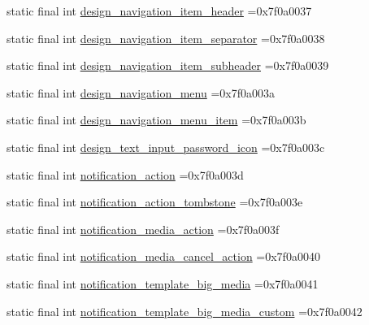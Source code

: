 \begin{DoxyCompactItemize}
\item 
static final int \mbox{\hyperlink{classbr_1_1unb_1_1cic_1_1mp_1_1marketmaster_1_1R_1_1layout_a9337038bad71dd40e637136ec0057a3c}{design\+\_\+navigation\+\_\+item\+\_\+header}} =0x7f0a0037
\item 
static final int \mbox{\hyperlink{classbr_1_1unb_1_1cic_1_1mp_1_1marketmaster_1_1R_1_1layout_a5ff2a171d26e739d5a6752ec79a5423c}{design\+\_\+navigation\+\_\+item\+\_\+separator}} =0x7f0a0038
\item 
static final int \mbox{\hyperlink{classbr_1_1unb_1_1cic_1_1mp_1_1marketmaster_1_1R_1_1layout_acec0765c8b8c0e75899d2e8a717c468a}{design\+\_\+navigation\+\_\+item\+\_\+subheader}} =0x7f0a0039
\item 
static final int \mbox{\hyperlink{classbr_1_1unb_1_1cic_1_1mp_1_1marketmaster_1_1R_1_1layout_a94fc03cfe04b2fdd609c22db4cee2d8a}{design\+\_\+navigation\+\_\+menu}} =0x7f0a003a
\item 
static final int \mbox{\hyperlink{classbr_1_1unb_1_1cic_1_1mp_1_1marketmaster_1_1R_1_1layout_a3412d12d7cde2d1b6358a148ec426e03}{design\+\_\+navigation\+\_\+menu\+\_\+item}} =0x7f0a003b
\item 
static final int \mbox{\hyperlink{classbr_1_1unb_1_1cic_1_1mp_1_1marketmaster_1_1R_1_1layout_a9e9cf4b757e2566ae545f5e9435e3c17}{design\+\_\+text\+\_\+input\+\_\+password\+\_\+icon}} =0x7f0a003c
\item 
static final int \mbox{\hyperlink{classbr_1_1unb_1_1cic_1_1mp_1_1marketmaster_1_1R_1_1layout_a72d446c09039a7f4974fb0a658cb11a3}{notification\+\_\+action}} =0x7f0a003d
\item 
static final int \mbox{\hyperlink{classbr_1_1unb_1_1cic_1_1mp_1_1marketmaster_1_1R_1_1layout_aa8e1ec55e190e94d29de46c0ff27987f}{notification\+\_\+action\+\_\+tombstone}} =0x7f0a003e
\item 
static final int \mbox{\hyperlink{classbr_1_1unb_1_1cic_1_1mp_1_1marketmaster_1_1R_1_1layout_a91d7b1c87f11e83e76f6e98b2d571363}{notification\+\_\+media\+\_\+action}} =0x7f0a003f
\item 
static final int \mbox{\hyperlink{classbr_1_1unb_1_1cic_1_1mp_1_1marketmaster_1_1R_1_1layout_a91006df88795dfa614ace6c088acf29e}{notification\+\_\+media\+\_\+cancel\+\_\+action}} =0x7f0a0040
\item 
static final int \mbox{\hyperlink{classbr_1_1unb_1_1cic_1_1mp_1_1marketmaster_1_1R_1_1layout_abc499c1a9fe0a8d2f7630a360fdab1ae}{notification\+\_\+template\+\_\+big\+\_\+media}} =0x7f0a0041
\item 
static final int \mbox{\hyperlink{classbr_1_1unb_1_1cic_1_1mp_1_1marketmaster_1_1R_1_1layout_a790ed4517aab8f65a9fefdf5962bccc9}{notification\+\_\+template\+\_\+big\+\_\+media\+\_\+custom}} =0x7f0a0042

\end{DoxyCompactItemize}
